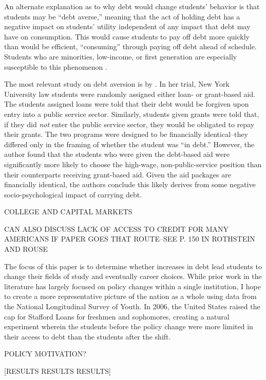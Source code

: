 \documentclass{article}
\begin{document}
	An alternate explanation as to why debt would change students' behavior is that students may be ``debt averse,'' meaning that the act of holding debt has a negative impact on students' utility independent of any impact that debt may have on consumption. This would cause students to pay off debt more quickly than would be efficient, ``consuming'' through paying off debt ahead of schedule. Students who are minorities, low-income, or first generation are especially susceptible to this phenomenon \parencite{burdman2005, field2009, callender2005}. 
	
	The most relevant study on debt aversion is by \textcite{field2009}. In her trial, New York University law students were randomly assigned either loan- or grant-based aid. The students assigned loans were told that their debt would be forgiven upon entry into a public service sector. Similarly, students given grants were told that, if they did \emph{not} enter the public service sector, they would be obligated to repay their grants. The two programs were designed to be financially identical--they differed only in the framing of whether the student was ``in debt.'' However, the author found that the students who were given the debt-based aid were significantly more likely to choose the high-wage, non-public-service position than their counterparts receiving grant-based aid. Given the aid packages are financially identical, the authors conclude this likely derives from some negative socio-psychological impact of carrying debt.
	
	COLLEGE AND CAPITAL MARKETS  
	
	CAN ALSO DISCUSS LACK OF ACCESS TO CREDIT FOR MANY AMERICANS IF PAPER GOES THAT ROUTE--SEE P. 150 IN ROTHSTEIN AND ROUSE
	
	The focus of this paper is to determine whether increases in debt lead students to change their fields of study and eventually career choices. While prior work in the literature has largely focused on policy changes within a single institution, I hope to create a more representative picture of the nation as a whole using data from the National Longitudinal Survey of Youth. In 2006, the United States raised the cap for Stafford Loans for freshmen and sophomores, creating a natural experiment wherein the students before the policy change were more limited in their access to debt than the students after the shift.
	
	POLICY MOTIVATION?
	
	[RESULTS RESULTS RESULTS]
	
\end{document}
